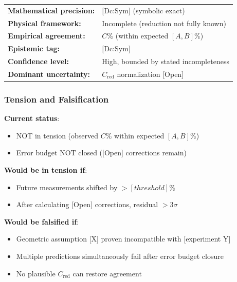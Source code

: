 \begin{tcolorbox}[colback=blue!5,colframe=blue!75!black,title=Result Status]

\begin{tabular}{ll}
\textbf{Mathematical precision:} & [Dc:Sym] (symbolic exact) \\
\textbf{Physical framework:} & Incomplete (reduction not fully known) \\
\textbf{Empirical agreement:} & $C\%$ (within expected $[A, B]\%$) \\
\textbf{Epistemic tag:} & [Dc:Sym] \\
\textbf{Confidence level:} & High, bounded by stated incompleteness \\
\textbf{Dominant uncertainty:} & $C_{\mathrm{red}}$ normalization [Open] \\
\end{tabular}

\end{tcolorbox}


\subsubsection{Tension and Falsification}

\textbf{Current status}:
\begin{itemize}
\item NOT in tension (observed $C\%$ within expected $[A,B]\%$)
\item Error budget NOT closed ([Open] corrections remain)
\end{itemize}

\textbf{Would be in tension if}:
\begin{itemize}
\item Future measurements shifted by $> [threshold]\%$
\item After calculating [Open] corrections, residual $> 3\sigma$
\end{itemize}

\textbf{Would be falsified if}:
\begin{itemize}
\item Geometric assumption [X] proven incompatible with [experiment Y]
\item Multiple predictions simultaneously fail after error budget closure
\item No plausible $C_{\mathrm{red}}$ can restore agreement
\end{itemize}


